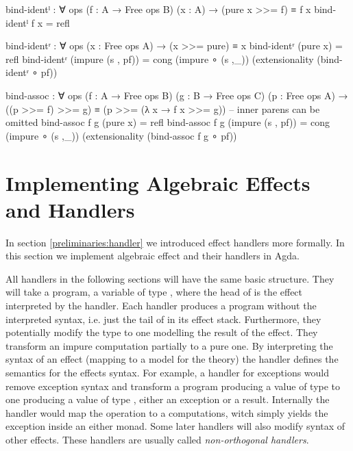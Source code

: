 \begin{code}[number=bind-ident-left]
bind-identˡ : ∀ {ops} (f : A → Free ops B) (x : A) → (pure x >>= f) ≡ f x
bind-identˡ f x = refl
\end{code}
\begin{code}[number=bind-ident-right]
bind-identʳ : ∀ {ops} (x : Free ops A) → (x >>= pure) ≡ x
bind-identʳ (pure x)           = refl
bind-identʳ (impure (s , pf))  = cong (impure ∘ (s ,_)) (extensionality (bind-identʳ ∘ pf))
\end{code}
\begin{code}[number=bind-assoc]
bind-assoc : ∀ {ops} (f : A → Free ops B) (g : B → Free ops C) (p : Free ops A) →
  ((p >>= f) >>= g) ≡ (p >>= (λ x → f x >>= g)) -- inner parens can be omitted
bind-assoc f g (pure x)           = refl
bind-assoc f g (impure (s , pf))  = cong (impure ∘ (s ,_)) (extensionality (bind-assoc f g ∘ pf))
\end{code}


\section{Implementing Algebraic Effects and Handlers}
\label{first-order:effects-and-handlers}

In section \ref{preliminaries:handler} we introduced effect handlers more
formally.
In this section we implement algebraic effect and their handlers in Agda.

All handlers in the following sections will have the same basic structure.
They will take a program, a variable of type
\AgdaSpace{}\AgdaSpace{},
where the head of  is the effect interpreted by the handler.
Each handler produces a program without the interpreted syntax, i.e. just the
tail of  in its effect stack.
Furthermore, they potentially modify the type  to one modelling
the result of the effect.
They transform an impure computation partially to a pure one.
By interpreting the syntax of an effect (mapping to a model for the theory) the
handler defines the semantics for the effects syntax.
For example, a handler for exceptions would remove exception syntax and
transform a program producing a value of type  to one producing
a value of type
\AgdaSpace{}\AgdaSpace{},
either an exception or a result.
Internally the handler would map the 
 operation to a 
computations, witch simply yields the exception inside an either monad.
Some later handlers will also modify syntax of other effects.
These handlers are usually called \textit{non-orthogonal handlers}.

